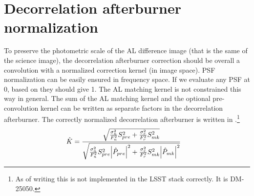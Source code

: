 \section{Decorrelation afterburner normalization}
\par To preserve the photometric scale of the AL difference
image (that is the same of the science image), the decorrelation
afterburner correction should be overall a convolution with a
normalized correction kernel (in image space). PSF normalization can
be easily ensured in frequency space. If we evaluate any PSF at 0,
based on  they should give 1. The AL matching kernel is
not constrained this way in general. The sum of the AL matching kernel
and the optional pre-convolution kernel can be written as separate
factors in the decorrelation afterburner. The correctly normalized
decorrelation afterburner is written in .\footnote{As of
  writing this is not implemented in the LSST stack correctly. It is
  DM-25050.}
%
\begin{align}
  \hat{K} &= \frac{\sqrt{\frac{\sigma_n^2}{F_n^2}S_{pre}^2 + \frac{\sigma_r^2}{F_r^2}S_{mk}^2}}
  {\sqrt{\frac{\sigma_n^2}{F_n^2}S_{pre}^2\abs{\hat{P}_{pre}}^2 + \frac{\sigma_r^2}{F_r^2}S_{mk}^2
  \abs{\hat{P}_{mk}}^2}}
\label{eq:KPre}
\end{align}
%
